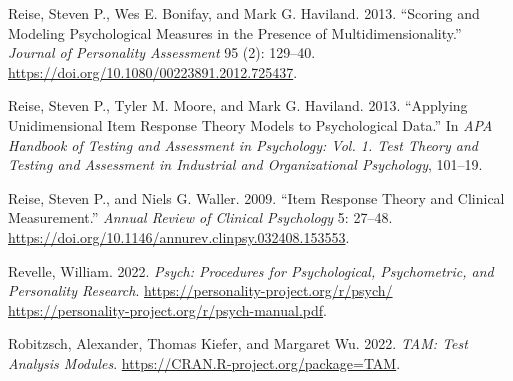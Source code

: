 \documentclass[
  letterpaper,
  DIV=11,
  numbers=noendperiod]{scrreport}
\newlength{\cslhangindent}
\newlength{\cslentryspacingunit} %
\newenvironment{CSLReferences}[2] %
 {%
  \setlength{\parindent}{0pt}
  \ifodd #1
  \let\oldpar\par
  \def\par{\hangindent=\cslhangindent\oldpar}
  \fi
  \setlength{\parskip}{#2\cslentryspacingunit}
 }%
 {}
\begin{document}
\begin{CSLReferences}{1}{0}
\leavevmode{}%
Reise, Steven P., Wes E. Bonifay, and Mark G. Haviland. 2013. {``Scoring
and Modeling Psychological Measures in the Presence of
Multidimensionality.''} \emph{Journal of Personality Assessment} 95 (2):
129--40. \url{https://doi.org/10.1080/00223891.2012.725437}.

\leavevmode{}%
Reise, Steven P., Tyler M. Moore, and Mark G. Haviland. 2013.
{``Applying Unidimensional Item Response Theory Models to Psychological
Data.''} In \emph{APA Handbook of Testing and Assessment in Psychology:
Vol. 1. Test Theory and Testing and Assessment in Industrial and
Organizational Psychology}, 101--19.

\leavevmode{}%
Reise, Steven P., and Niels G. Waller. 2009. {``Item Response Theory and
Clinical Measurement.''} \emph{Annual Review of Clinical Psychology} 5:
27--48. \url{https://doi.org/10.1146/annurev.clinpsy.032408.153553}.

\leavevmode{}%
Revelle, William. 2022. \emph{Psych: Procedures for Psychological,
Psychometric, and Personality Research}.
\href{https://personality-project.org/r/psych/\%0Ahttps://personality-project.org/r/psych-manual.pdf}{https://personality-project.org/r/psych/
https://personality-project.org/r/psych-manual.pdf}.

\leavevmode{}%
Robitzsch, Alexander, Thomas Kiefer, and Margaret Wu. 2022. \emph{TAM:
Test Analysis Modules}. \url{https://CRAN.R-project.org/package=TAM}.

\end{CSLReferences}
\end{document}
